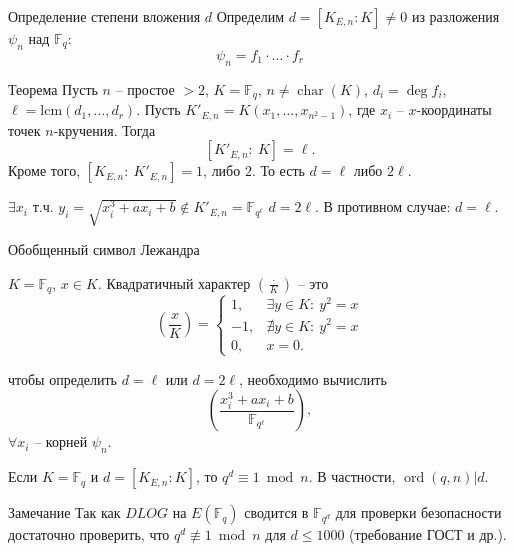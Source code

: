 \documentclass{beamer}
\begin{document}
\begin{frame}{Определение степени вложения $d$}
Определим $d = [K_{E,n} : K] \ne 0$ из разложения $\psi_n$ над $\mathbb{F}_q$: 
\[\psi_n = f_1 \cdot \ldots \cdot f_r\]
\begin{block}{Теорема}
Пусть $n$ -- простое $> 2$, $K = \mathbb{F}_q$, $n \ne \operatorname{char}(K)$,
$d_i = \deg {f_i}$,
$\ell = \mathrm{lcm}(d_1, \ldots, d_r)$.
Пусть $K'_{E,n} = K( {{x_1}, \ldots, {x_{{n^2} - 1}}})$, где ${x_i}$ -- $x$-координаты точек $n$-кручения. Тогда 
    \[[ {K'_{E,n}:\:K} ] = \ell.
    \]
    Кроме того, $[ {{K_{E,n}}:\:K'_{E,n}} ] = 1$, либо $2$. То есть $d = \ell$ либо $2\ell$. 
\end{block}

\structure{$\triangleleft$}
    $\exists x_i$ т.ч. $y_i = \sqrt{x_i^3 + a x_i + b} \not\in K'_{E,n} = \mathbb{F}_{q^\ell}$ \structure{$\implies$} $d = 2 \ell$.
    В противном случае: $d = \ell$.
\structure{$\triangleright$}
\end{frame}

\begin{frame}{Обобщенный символ Лежандра}
\begin{definition}
    $K = \mathbb{F}_q$, $x \in K$. Квадратичный характер $\left( \frac{ \cdot }{K} \right)$ -- это 
    $$
    \left( \frac{x}{K} \right ) =
    \begin{cases}
        1,& \exists y \in K:\:{y^2} = x \\
        -1,& \nexists y \in K:\:{y^2} = x \\
        0, & x = 0.
    \end{cases}
    $$
\end{definition}
\begin{center}
\structure{$\Downarrow$}
\end{center}
чтобы определить $d = \ell$ или $d = 2\ell$, необходимо вычислить 
\[
\left(  {\frac{x_i^3 + a{x_i} + b}{\mathbb{F}_{q^\ell}}} \right ),
\]
$\forall x_i$ -- корней $\psi_n$. 
\end{frame}

\begin{frame}
\begin{lemma}
Если $K = \mathbb{F}_q$ и $d = [K_{E,n} : K]$, то $q^d \equiv 1 \bmod{n}$. В частности, $\operatorname{ord}(q,n) | d$.
\end{lemma}

\vspace*{1em}
\begin{block}{Замечание}
Так как $DLOG$ на $E(\mathbb{F}_q)$ сводится в $\mathbb{F}_{q^d}$ для проверки безопасности достаточно проверить, что $q^d \not\equiv 1 \bmod{n}$ для $d \leq 1000$ (требование ГОСТ и др.).
\end{block}
\end{frame}
\end{document}
